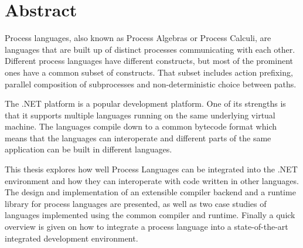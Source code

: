 \chapter{Abstract}

	Process languages, also known as Process Algebras or Process Calculi, are 
	languages that are built up of distinct processes communicating with each 
	other. Different process languages have different constructs, but most of 
	the prominent ones have a common subset of constructs. That subset includes 
	action prefixing, parallel composition of subprocesses and non-deterministic 
	choice between paths.

	The .NET platform is a popular development platform. One of its strengths is
	that it supports multiple languages running on the same underlying virtual 
	machine. The languages compile down to a common bytecode format which means 
	that the languages can interoperate and different parts of the same 
	application can be built in different languages.

	This thesis explores how well Process Languages can be integrated into the 
	.NET environment and how they can interoperate with code written in other 
	languages.  The design and implementation of an extensible compiler backend 
	and a runtime library for process languages are presented, as well as two 
	case studies of languages implemented using the common compiler and runtime. 
	Finally a quick overview is given on how to integrate a process language 
	into a state-of-the-art integrated development environment.